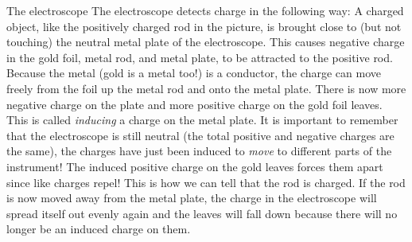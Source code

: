 \begin{Investigation}{The electroscope}
        \label{m38781*id200552}The electroscope detects charge in the following way: A charged object, like the positively charged rod in the picture, is brought close to (but not touching) the neutral metal plate of the electroscope. This causes negative charge in the gold foil, metal rod, and metal plate, to be attracted to the positive rod. Because the metal (gold is a metal too!) is a conductor, the charge can move freely from the foil up the metal rod and onto the metal plate. There is now more negative charge on the plate and more positive charge on the gold foil leaves. This is called \textsl{inducing} a charge on the metal plate. It is important to remember that the electroscope is still neutral (the total positive and negative charges are the same), the charges have just been induced to \textsl{move} to different parts of the instrument! The induced positive charge on the gold leaves forces them apart since like charges repel! This is how we can tell that the rod is charged. If the rod is now moved away from the metal plate, the charge in the electroscope will spread itself out evenly again and the leaves will fall down because there will no longer be an induced charge on them.\par 
        \label{m38781*uid12}


\end{Investigation}
